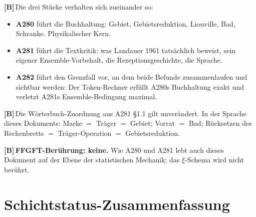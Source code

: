 \documentclass[11pt,a4paper]{article}
\newcommand{\LB}{\textcolor{layB}{\textbf{\footnotesize\textsf{[B]}}}\,}
\begin{document}
\LB Die drei Stücke verhalten sich zueinander so:

\begin{itemize}[leftmargin=1.4em,itemsep=0.3em]
  \item \textbf{A280} führt die Buchhaltung: Gebiet, Gebietsreduktion, Liouville,
        Bad, Schranke. Physikalischer Kern.
  \item \textbf{A281} führt die Textkritik: was Landauer 1961 tatsächlich beweist,
        sein eigener Ensemble-Vorbehalt, die Rezeptionsgeschichte, die Sprache.
  \item \textbf{A282} führt den Grenzfall vor, an dem beide Befunde zusammenlaufen
        und sichtbar werden: Der Token-Rechner erfüllt A280s Buchhaltung exakt und
        verletzt A281s Ensemble-Bedingung maximal.
\end{itemize}

\LB Die Wörterbuch-Zuordnung aus A281 §1.1 gilt unverändert. In der Sprache dieses
Dokuments: Marke $=$ Träger $=$ Gebiet; Vorrat $=$ Bad; Rücksetzen des
Rechenbretts $=$ Träger-Operation $=$ Gebietsreduktion.

\LB \textbf{FFGFT-Berührung: keine.} Wie A280 und A281 lebt auch dieses Dokument
auf der Ebene der statistischen Mechanik; das $\xi$-Schema wird nicht berührt.

\section{Schichtstatus-Zusammenfassung}
\end{document}
